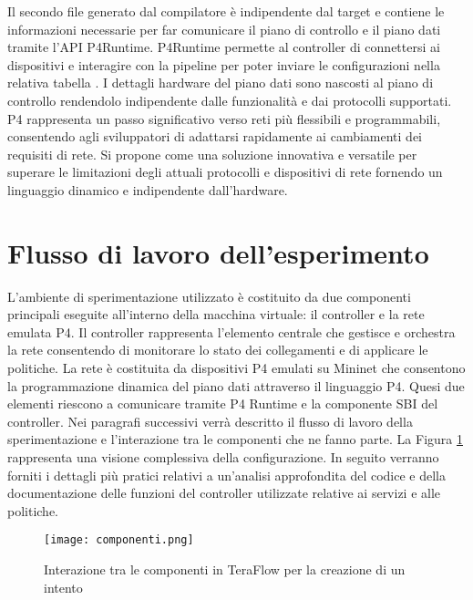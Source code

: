 \newline Il secondo file generato dal compilatore è indipendente dal target e 
contiene le informazioni necessarie per far comunicare il piano di controllo e il piano dati tramite l'API P4Runtime.
\newline P4Runtime permette al controller di connettersi ai dispositivi e interagire con la pipeline 
per poter inviare le configurazioni nella relativa tabella \cite{p4Article}. 
I dettagli hardware del piano dati sono nascosti al piano di controllo rendendolo indipendente dalle funzionalità e dai protocolli supportati.
P4 rappresenta un passo significativo verso reti più flessibili e programmabili, consentendo agli sviluppatori di adattarsi rapidamente ai cambiamenti dei requisiti di rete.
Si propone come una soluzione innovativa e versatile per superare le limitazioni degli attuali protocolli e dispositivi di rete fornendo un linguaggio dinamico e indipendente dall'hardware.

\section{Flusso di lavoro dell'esperimento}
L'ambiente di sperimentazione utilizzato è costituito da due componenti principali eseguite all'interno della macchina virtuale: il controller e la rete emulata P4.
\newline Il controller rappresenta l'elemento centrale che gestisce e orchestra la rete consentendo di monitorare lo stato dei collegamenti
e di applicare le politiche.
\newline La rete è costituita da dispositivi P4 emulati su Mininet che consentono la programmazione dinamica del piano dati attraverso il linguaggio P4.
Quesi due elementi riescono a comunicare tramite P4 Runtime e la componente SBI del controller.
\newline Nei paragrafi successivi verrà descritto
il flusso di lavoro della sperimentazione e l'interazione tra le componenti che ne fanno parte.
La Figura \ref{fig:componenti} rappresenta una visione complessiva della configurazione.
In seguito verranno forniti i dettagli più pratici relativi a un'analisi approfondita del codice e della documentazione delle funzioni del controller utilizzate relative ai servizi e alle politiche.
\begin{figure}[h]
    \centering
   \texttt{[image: componenti.png]}
    \caption{Interazione tra le componenti in TeraFlow per la creazione di un intento \cite{demo}}
    \label{fig:componenti}
\end{figure}
